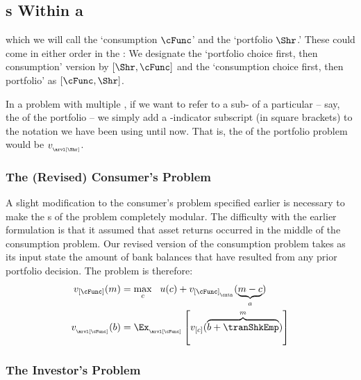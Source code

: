 \hypertarget{stages-within-a-period}{}
\subsection{{\Stg}s Within a {\Interval}}\label{subsec:stageswithin}

which we will call the `consumption {\stg} $\cFunc$' and the `portfolio {\stg} $\Shr$.'  These could come in either order in the {\interval}: We designate the `portfolio choice first, then consumption' version by $[\Shr,\cFunc]$ and the `consumption choice first, then portfolio' as $[\cFunc,\Shr]$.

In a problem with multiple {\stgs}, if we want to refer to a sub-{\move} of a particular {\stg} -- say, the {\Arrival} {\stg} of the portfolio {\stg} -- we simply add a {\stg}-indicator subscript (in square brackets) to the notation we have been using until now.  That is, the {\Arrival} {\stg} of the portfolio problem would be $\vFunc_{_\arvl[\Shr]}$.

\hypertarget{revised-consumers-problem}{}
\subsubsection{The (Revised) Consumer's Problem}\label{subsubsec:revised-consumers-problem}

A slight modification to the consumer's problem specified earlier is necessary to make the {\stg}s of the problem completely modular.  The difficulty with the earlier formulation is that it assumed that asset returns occurred in the middle {\move} of the consumption problem.  Our revised version of the consumption problem takes as its input state the amount of bank balances that have resulted from any prior portfolio decision.  The problem is therefore:
  \begin{equation}\begin{gathered}\begin{aligned}
 \vFunc_{[\cFunc]}(\mNrm) & =  \max_{\cNrm} ~~ \uFunc(\cNrm)+  \vFunc_{[\cFunc]_{_\cntn}}(\underbrace{\mNrm-\cNrm}_{\aNrm})             
\\    \vFunc_{_\arvl[\cFunc]}(\bNrm) & = \Ex_{_\arvl[\cFunc]}\left[\vFunc_{[\cNrm]}(\overbrace{\bNrm+\tranShkEmp}^{m})\right] \label{eq:vBalances}
      \end{aligned}\end{gathered}\end{equation}


\hypertarget{subsubsec:investors-problem}{}
\subsubsection{The Investor's Problem}\label{subsubsec:investors-problem}


